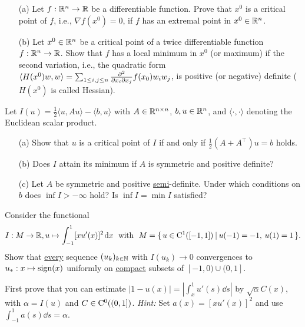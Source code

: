 \documentclass[12pt,a4paper]{article}
\begin{document}

\setcounter{AUFGABE}{0}

\begin{enumerate}
\item[(a)] Let $f:{\mathbb R}^n \to {\mathbb R}$ be a differentiable function.
Prove that $x^0$ is a critical point of $f$, i.e., $\nabla f(x^0)=0$,
if $f$ has an extremal point in $x^0 \in {\mathbb R}^n$.

\item[(b)] Let $x^0 \in {\mathbb R}^n$ be a critical point of a twice differentiable function $f: {\mathbb R}^n \to {\mathbb R}$. 
Show that $f$ has a local minimum in $x^0$ (or maximum)
if the second variation, i.e., the quadratic form 
$\langle H(x^0)w,w\rangle = \sum_{1\leq i,j\leq n}\frac{\partial^2}{\partial x_i\partial x_j}f(x_0)w_iw_j$,
is positive (or negative) definite ($H(x^0)$ is called Hessian).
\end{enumerate}



Let $I(u) = \frac{1}{2} \langle u,Au \rangle - \langle b,u \rangle$
with $A \in {\mathbb R}^{n \times n}$, $b,u \in {\mathbb R}^n$, and $\langle \cdot,\cdot \rangle$
denoting the Euclidean scalar product.
\begin{enumerate}
\item[(a)] Show that $u$ is a critical point of $I$ if and only if $\frac{1}{2}(A + A^\top)u = b$ holds.

\item[(b)] Does $I$ attain its minimum if $A$ is symmetric and positive definite?

\item[(c)] Let $A$ be symmetric and positive \underline{semi}-definite. Under which conditions on
$b$ does $\inf I > - \infty$ hold? 
Is  $\inf I = \min I$ satisfied?  
\end{enumerate}



Consider the functional
\[
I:M\to {\mathbb R}, u \mapsto \int_{-1}^1 [x u'(x)]^2 \;\!\mathrm{d} x \ \text{ with } \
M=\{\,  u\in {\mathrm C}^1([-1,1]) \: | \:  u(-1)=-1, \: u(1)=1 \,\}.
\]
Show that \underline{every} sequence 
$(u_k)_{k\in {\mathbb N}}$ with $I(u_k)\to 0$ convergences to 
$u_*:x\mapsto \mathop{\rm sign}(x)$ uniformly on \underline{compact} subsets of $[-1,0)\cup (0,1]$. 

First prove that you can estimate $|1{-}u(x)|=|\int_x^1 u'(s)\dd s|$ by 
$\sqrt\alpha C(x)$, with $\alpha =I(u)$ and $C \in {\mathrm C}^0((0,1])$. 
\textit{Hint:} Set $a(x)=[x u'(x)]^2$ and use $\int_{-1}^1 a(s)\dd
s=\alpha$. 
\end{document}
